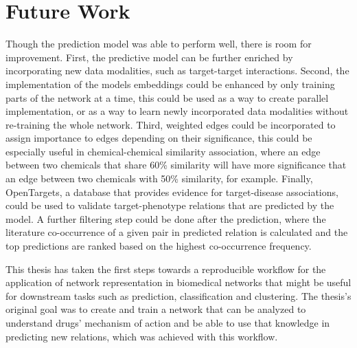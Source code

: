 \section{Future Work}
Though the prediction model was able to perform well, there is room for improvement.
First, the predictive model can be further enriched by incorporating new data modalities, such as target-target interactions.
Second, the implementation of the models embeddings could be enhanced by only training parts of the network at a time, this could be used as a way to create parallel implementation, or as a way to learn newly incorporated data modalities without re-training the whole network.
Third, weighted edges could be incorporated to assign importance to edges depending on their significance, this could be especially useful in chemical-chemical similarity association, where an edge between two chemicals that share 60\% similarity will have more significance that an edge between two chemicals with 50\% similarity, for example.
Finally, OpenTargets, a database that provides evidence for target-disease associations, could be used to validate target-phenotype relations that are predicted by the model. A further filtering step could be done after the prediction, where the literature co-occurrence of a given pair in predicted relation is calculated and the top predictions are ranked based on the highest co-occurrence frequency.

This thesis has taken the first steps towards a reproducible workflow for the application of network representation in biomedical networks that might be useful for downstream tasks such as prediction, classification and clustering. The thesis’s original goal was to create and train a network that can be analyzed to understand drugs’ mechanism of action and be able to use that knowledge in predicting new relations, which was achieved with this workflow. 
